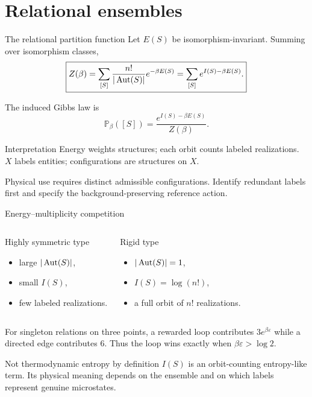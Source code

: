 \section{Relational ensembles}

\begin{frame}{The relational partition function}
  Let $E(S)$ be isomorphism-invariant. Summing over isomorphism classes,
  \[
    \boxed{
      Z(\beta)=\sum_{[S]}
      \frac{n!}{|\operatorname{Aut}(S)|}e^{-\beta E(S)}
      =\sum_{[S]}e^{I(S)-\beta E(S)}.}
  \]

  The induced Gibbs law is
  \[
    \mathbb P_\beta([S])
      =\frac{e^{I(S)-\beta E(S)}}{Z(\beta)}.
  \]

  \begin{block}{Interpretation}
    Energy weights structures; each orbit counts labeled realizations.
    $X$ labels entities; configurations are structures on $X$.
  \end{block}
  Physical use requires distinct admissible configurations. Identify redundant
  labels first and specify the background-preserving reference action.
\end{frame}

\begin{frame}{Energy--multiplicity competition}
  \begin{columns}[T]
      \begin{block}{Highly symmetric type}
        \begin{itemize}
          \item large $|\operatorname{Aut}(S)|$,
          \item small $I(S)$,
          \item few labeled realizations.
        \end{itemize}
      \end{block}
      \begin{block}{Rigid type}
        \begin{itemize}
          \item $|\operatorname{Aut}(S)|=1$,
          \item $I(S)=\log(n!)$,
          \item a full orbit of $n!$ realizations.
        \end{itemize}
      \end{block}
  \end{columns}

  \vspace{0.5em}
  For singleton relations on three points, a rewarded loop contributes
  $3e^{\beta\varepsilon}$ while a directed edge contributes $6$. Thus the loop
  wins exactly when $\beta\varepsilon>\log 2$.

  \begin{alertblock}{Not thermodynamic entropy by definition}
    $I(S)$ is an orbit-counting entropy-like term. Its physical meaning depends
    on the ensemble and on which labels represent genuine microstates.
  \end{alertblock}
\end{frame}

